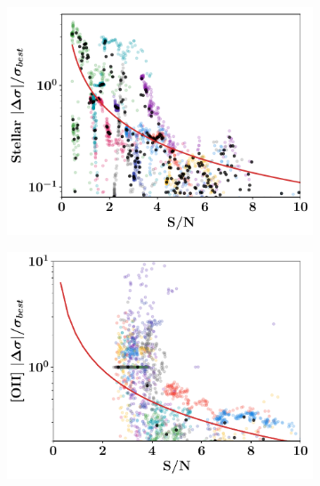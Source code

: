 \documentclass[12pt, twocolumn]{revtex4}    %
\begin{document}
\begin{figure}
\centering
\begin{subfigure}[b]{0.495\textwidth}
    \centering
    \includegraphics[width=\textwidth]{data/ppxf_sigma_frac_error_vs_sn}
    \label{fig:mean and std of net14}
\end{subfigure}
\begin{subfigure}[b]{0.495\textwidth}  
    \centering 
    \includegraphics[width=\textwidth]{data/lmfit_sigma_frac_error_vs_sn}
    \label{fig:mean and std of net24}
\end{subfigure}
\begin{subfigure}[b]{0.495\textwidth}   
    \centering 

\end{subfigure}
\end{figure}
\end{document}
